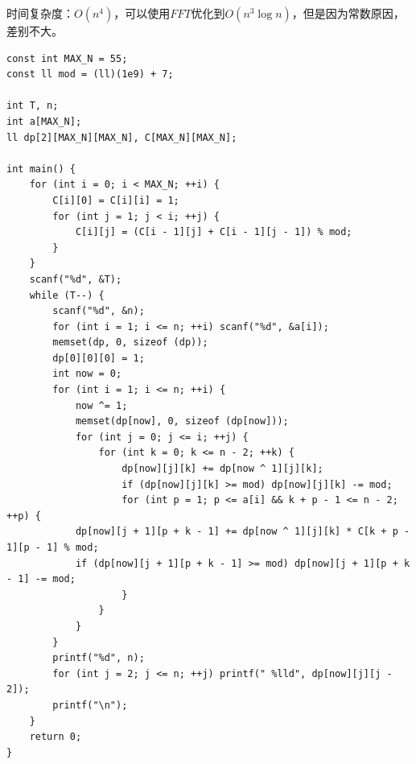 时间复杂度：$O(n^4)$，可以使用$FFT$优化到$O(n^3\log n)$，但是因为常数原因，差别不大。
\begin{lstlisting}
const int MAX_N = 55;
const ll mod = (ll)(1e9) + 7;

int T, n;
int a[MAX_N];
ll dp[2][MAX_N][MAX_N], C[MAX_N][MAX_N];

int main() {
    for (int i = 0; i < MAX_N; ++i) {
        C[i][0] = C[i][i] = 1;
        for (int j = 1; j < i; ++j) {
            C[i][j] = (C[i - 1][j] + C[i - 1][j - 1]) % mod;
        }
    }
    scanf("%d", &T);
    while (T--) {
        scanf("%d", &n);
        for (int i = 1; i <= n; ++i) scanf("%d", &a[i]);
        memset(dp, 0, sizeof (dp));
        dp[0][0][0] = 1;
        int now = 0;
        for (int i = 1; i <= n; ++i) {
            now ^= 1;
            memset(dp[now], 0, sizeof (dp[now]));
            for (int j = 0; j <= i; ++j) {
                for (int k = 0; k <= n - 2; ++k) {
                    dp[now][j][k] += dp[now ^ 1][j][k];
                    if (dp[now][j][k] >= mod) dp[now][j][k] -= mod;
                    for (int p = 1; p <= a[i] && k + p - 1 <= n - 2; ++p) {
            dp[now][j + 1][p + k - 1] += dp[now ^ 1][j][k] * C[k + p - 1][p - 1] % mod;
            if (dp[now][j + 1][p + k - 1] >= mod) dp[now][j + 1][p + k - 1] -= mod;
                    }
                }
            }
        }
        printf("%d", n);
        for (int j = 2; j <= n; ++j) printf(" %lld", dp[now][j][j - 2]);
        printf("\n");
    }
    return 0;
}
\end{lstlisting}

%
